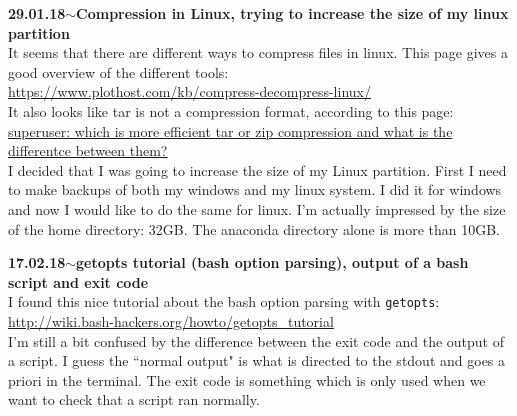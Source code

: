 \documentclass[11pt,a4paper]{article}
\newenvironment{loggentry}[2]%
{\noindent\textbf{#1}\hspace{1cm}$\mathbf{\sim}$\text{ }\textbf{#2}\\}{\vspace{0.5cm}}
\begin{document}
\begin{loggentry}{29.01.18}{Compression in Linux, trying to increase the size of my linux partition}
It seems that there are different ways to compress files in linux. This page gives a good overview of the different tools:\\
\url{https://www.plothost.com/kb/compress-decompress-linux/}\\
It also looks like tar is not a compression format, according to this page:\\
\href{https://superuser.com/questions/173756/which-is-more-efficient-tar-or-zip-compression-what-is-the-difference-between#173757}{superuser: which is more efficient tar or zip compression and what is the differentce between them?}\\
I decided that I was going to increase the size of my Linux partition. First I need to make backups of both my windows and my linux system. I did it for windows and now I would like to do the same for linux. I'm actually impressed by the size of the home directory: 32GB. The anaconda directory alone is more than 10GB.
\end{loggentry}

\begin{loggentry}{17.02.18}{getopts tutorial (bash option parsing), output of a bash script and exit code}
I found this nice tutorial about the bash option parsing with \texttt{getopts}:\\
\url{http://wiki.bash-hackers.org/howto/getopts_tutorial}\\
I'm still a bit confused by the difference between the exit code and the output of a script. I guess the ``normal output" is what is directed to the stdout and goes a priori in the terminal. The exit code is something which is only used when we want to check that a script ran normally.
\end{loggentry}
\end{document}

